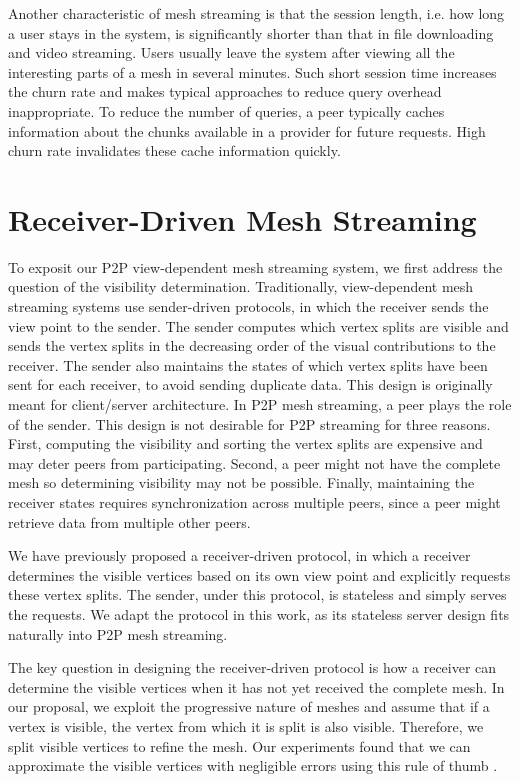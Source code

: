     Another characteristic of mesh streaming is that the
    session length, i.e. how long a user stays in the
    system, is significantly shorter than that in file
    downloading and video streaming.  Users usually leave
    the system after viewing all the interesting parts of a
    mesh in several minutes.  Such short session time
    increases the churn rate and makes typical approaches to
    reduce query overhead inappropriate. To reduce the
    number of queries, a peer typically caches information
    about the chunks available in a provider for future
    requests.  High churn rate invalidates these cache
    information quickly.

\section{Receiver-Driven Mesh Streaming}
\label{s:receiver}

To exposit our P2P view-dependent mesh streaming system, we first address
the question of the visibility determination.
Traditionally, view-dependent mesh streaming systems use sender-driven
protocols, in which the receiver sends the view point to the
sender.  The sender computes which vertex splits are visible
and sends the vertex splits in the decreasing order of the
visual contributions to the receiver.  The sender also
maintains the states of which vertex splits have been sent
for each receiver, to avoid sending duplicate data.  This
design is originally meant for client/server architecture.
In P2P mesh streaming, a peer plays the role of the sender.
This design is not desirable for P2P streaming for three
reasons.  First, computing the visibility and sorting the
vertex splits are expensive and may deter peers from
participating. Second, a peer might not have the complete
mesh so determining visibility may not be possible.
Finally, maintaining the receiver states requires
synchronization across multiple peers, since a peer might
retrieve data from multiple other peers.

We have previously \cite{Cheng2008} proposed a
receiver-driven protocol, in which a receiver determines the
visible vertices based on its own view point and explicitly
requests these vertex splits.  The sender, under this
protocol, is stateless and simply serves the requests.  We
adapt the protocol in this work, as its stateless server
design fits naturally into P2P mesh streaming.

The key question in designing the receiver-driven protocol
is how a receiver can determine the visible vertices when it
has not yet received the complete mesh.  In our proposal, 
we exploit the progressive nature of meshes and assume that 
if a vertex is visible, the vertex from which it is split is also
visible. Therefore,
we split visible vertices to refine the mesh.
Our experiments found that
we can approximate the visible vertices with negligible
errors using this rule of thumb \cite{Cheng2008}.

